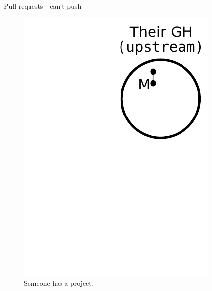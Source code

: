 \begin{frame}{Pull requests---can't push}
  \begin{figure}
    \includegraphics{fork_001.pdf}
    \\ Someone has a project.
    \\ \texttt{}
  \end{figure}
\end{frame}

